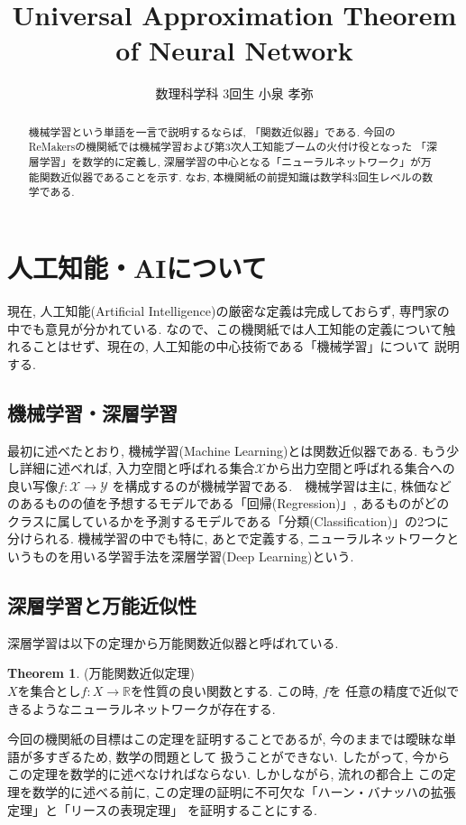 \documentclass[11pt, a4paper, dvipdfmx]{jsarticle}
\title{Universal Approximation Theorem of Neural Network}
\author{数理科学科 3回生 小泉 孝弥}
\date{}
\theoremstyle{definition}
\newtheorem*{Theorem*}{Theorem}
\newcommand{\R}{\mathbb{R}}
\newcommand{\X}{\mathcal{X}}
\newcommand{\Y}{\mathcal{Y}}
\begin{document}
\maketitle
\begin{abstract}
    機械学習という単語を一言で説明するならば, 「関数近似器」である.
    今回のReMakersの機関紙では機械学習および第3次人工知能ブームの火付け役となった
    「深層学習」を数学的に定義し, 深層学習の中心となる「ニューラルネットワーク」が万能関数近似器であることを示す.
    なお, 本機関紙の前提知識は数学科3回生レベルの数学である.
\end{abstract}
\section{人工知能・AIについて}
現在, 人工知能(Artificial Intelligence)の厳密な定義は完成しておらず, 専門家の中でも意見が分かれている.
なので、この機関紙では人工知能の定義について触れることはせず、現在の, 人工知能の中心技術である「機械学習」について
説明する.
\subsection{機械学習・深層学習}
最初に述べたとおり, 機械学習(Machine Learning)とは関数近似器である. 
もう少し詳細に述べれば, 入力空間と呼ばれる集合$\X$から出力空間と呼ばれる集合への良い写像$f:\X\to\Y$
を構成するのが機械学習である.　機械学習は主に, 株価などのあるものの値を予想するモデルである「回帰(Regression)」, 
あるものがどのクラスに属しているかを予測するモデルである「分類(Classification)」の2つに分けられる. 機械学習の中でも特に, あとで定義する, ニューラルネットワークと
いうものを用いる学習手法を深層学習(Deep Learning)という.
\subsection{深層学習と万能近似性}
深層学習は以下の定理から万能関数近似器と呼ばれている. 
\begin{Theorem*}(万能関数近似定理)\\
    $X$を集合とし$f:X\to\R$を性質の良い関数とする. この時, $f$を
    任意の精度で近似できるようなニューラルネットワークが存在する.
\end{Theorem*}
今回の機関紙の目標はこの定理を証明することであるが, 今のままでは曖昧な単語が多すぎるため, 数学の問題として
扱うことができない. したがって, 今からこの定理を数学的に述べなければならない. しかしながら, 流れの都合上
この定理を数学的に述べる前に, この定理の証明に不可欠な「ハーン・バナッハの拡張定理」と「リースの表現定理」
を証明することにする.
\end{document}

